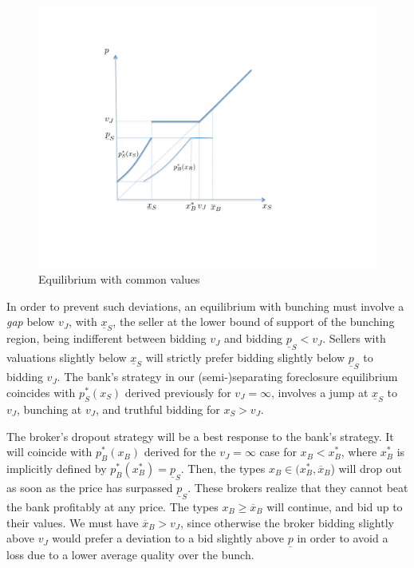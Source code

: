 \documentclass[11pt,twopage]{article}
\newcommand{\ol}{\overline}
\newcommand{\ul}{\underline}
\begin{document}
  

\begin{figure}[tf]
  \centering
  \includegraphics[scale = 0.6]{graphics/eqm_common.pdf}
  \caption{Equilibrium with common values}
  \label{fig:eqm_common}
\end{figure}

In order to prevent such deviations, an equilibrium with bunching must
involve a \emph{gap} below $v_J$, with $\underline x_S$, the seller at
the lower bound of support of the bunching region, being indifferent
between bidding $v_J$ and bidding $\ul p_S<v_J$. Sellers with
valuations slightly below $\ul x_S$ will strictly prefer bidding
slightly below $\ul p_S$ to bidding $v_J$.  The bank's strategy in our
(semi-)separating foreclosure equilibrium coincides with $p_S^*(x_S)$
derived previously for $v_J=\infty$, involves a jump at $\ul x_S$ to
$v_J$, bunching at $v_J$, and truthful bidding for $x_S > v_J$.

The broker's dropout strategy will be a best response to the bank's
strategy. It will coincide with $p_B^*(x_B)$ derived for the
$v_J=\infty$ case for $x_B < x_B^*$, where $x_B^*$ is implicitly
defined by $p_B^*(x_B^*)=\ul p_S$. Then, the types $x_B \in (x_B^*,\ol
x_B$) will drop out as soon as the price has surpassed $\ul
p_S$. These brokers realize that they cannot beat the bank profitably
at any price. The types $x_B \geq \ol x_B$ will continue, and bid up
to their values. We must have $\ol x_B > v_J$, since otherwise the
broker bidding slightly above $v_J$ would prefer a deviation to a bid
slightly above $\ul p$ in order to avoid a loss due to a lower average
quality over the bunch.
\end{document}
